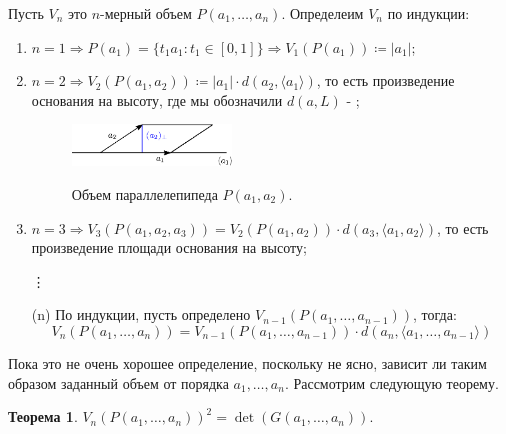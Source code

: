 \documentclass[12pt]{article}
\theoremstyle{definition}
\newtheorem{theorem}{Теорема}
\begin{document}
Пусть $V_n$ это $n$-мерный объем $P(a_1, \dotsc, a_n)$. Определеим $V_n$ по индукции:
\begin{enumerate}[label ={(\arabic*)}]
	\item $n=1 \Rightarrow P(a_1) = \{t_1 a_1 \colon t_1 \in [0,1]\} \Rightarrow V_1(P(a_1)) \coloneqq|a_1|$;
	\item $n=2 \Rightarrow V_2(P(a_1,a_2)) \coloneqq |a_1|{\cdot}d(a_2,\langle a_1 \rangle)$, то есть произведение основания на высоту, где мы обозначили $d(a,L)$ - ;
	\begin{figure}[H]
		\centering
		\includegraphics[width=0.4\textwidth]{7_4.eps}
		\label{7_4}
		\caption{Объем параллелепипеда $P(a_1,a_2)$.}
		\label{fig:Задание объема параллелепипеда}
	\end{figure}
	\item $n = 3 \Rightarrow V_3(P(a_1,a_2,a_3)) = V_2(P(a_1,a_2)){\cdot}d(a_3, \langle a_1, a_2 \rangle)$, то есть произведение площади основания на высоту;
	\item[\vdots]
	\item[(n)] По индукции, пусть определено $V_{n-1}(P(a_1, \dotsc, a_{n-1}))$, тогда:
	$$
		V_n(P(a_1,\dotsc,a_n)) =V_{n-1}(P(a_1, \dotsc, a_{n-1})){\cdot}d(a_n,\langle a_1, \dotsc, a_{n-1}\rangle)
	$$
\end{enumerate}
Пока это не очень хорошее определение, поскольку не ясно, зависит ли таким образом заданный объем от порядка $a_1, \dotsc, a_n$. Рассмотрим следующую теорему.
\begin{theorem}
	$V_n(P(a_1,\dotsc, a_n))^2 = \det{(G(a_1,\dotsc,a_n))}$.
\end{theorem}
\end{document}
